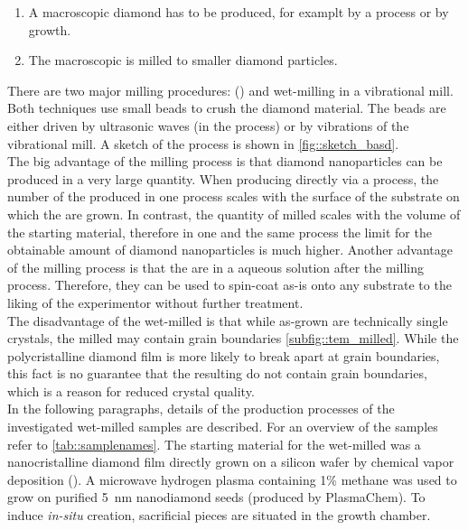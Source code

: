 	\begin{enumerate}
		\item A macroscopic diamond has to be produced, for examplt by a \HPHT process or by \CVD growth.
		\item The macroscopic is milled to smaller diamond particles.
	\end{enumerate}

	There are two major milling procedures: \basd (\BASD) and wet-milling in a vibrational mill.
	Both techniques use small beads to crush the diamond material. 
	The beads are either driven by ultrasonic waves (in the \BASD process) or by vibrations of the vibrational mill.
	A sketch of the process is shown in \autoref{fig::sketch_basd}.
	\\
	The big advantage of the milling process is that diamond nanoparticles can be produced in a very large quantity.
	When producing \nds directly via a \CVD process, the number of the produced \nds in one process scales with the surface of the substrate on which the \nds are grown.
	In contrast, the quantity of milled \nds scales with the volume of the starting material, therefore in one and the same process the limit for the obtainable amount of diamond nanoparticles is much higher.
	Another advantage of the milling process is that the \nds are in a aqueous solution after the milling process.
	Therefore, they can be used to spin-coat as-is onto any substrate to the liking of the experimentor without further treatment.
	\\
	The disadvantage of the wet-milled \nds is that while as-grown \CVD \nds are technically single crystals, the milled \nds may contain grain boundaries \autoref{subfig::tem_milled}.
	While the polycristalline diamond film is more likely to break apart at grain boundaries, this fact is no guarantee that the resulting \nds do not contain grain boundaries, which is a reason for reduced crystal quality.
	\\
	In the following paragraphs, details of the production processes of the investigated wet-milled samples are described. 
	For an overview of the samples refer to \autoref{tab::samplenames}.
	The starting material for the wet-milled \nds was a nanocristalline diamond film \cite{Williams2006a} directly grown on a silicon wafer by chemical vapor deposition (\CVD). 
	A microwave hydrogen plasma containing 1\% methane was used to grow on purified \SI{5}{\nano\meter} nanodiamond seeds (produced by PlasmaChem).
	To induce \textit{in-situ} \siv creation, sacrificial \Si pieces are situated in the growth chamber.
